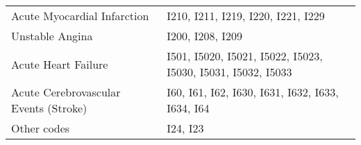 \begin{tabular}{ll}
    \toprule
    Acute Myocardial Infarction           & I210, I211, I219, I220, I221, I229                           \\
    Unstable Angina                       & I200, I208, I209                                             \\
    Acute Heart Failure                   & I501, I5020, I5021, I5022, I5023, I5030, I5031, I5032, I5033 \\
    Acute Cerebrovascular Events (Stroke) & I60, I61, I62, I630, I631, I632, I633, I634, I64             \\
    Other codes                           & I24, I23                                                     \\
    \bottomrule
\end{tabular}
